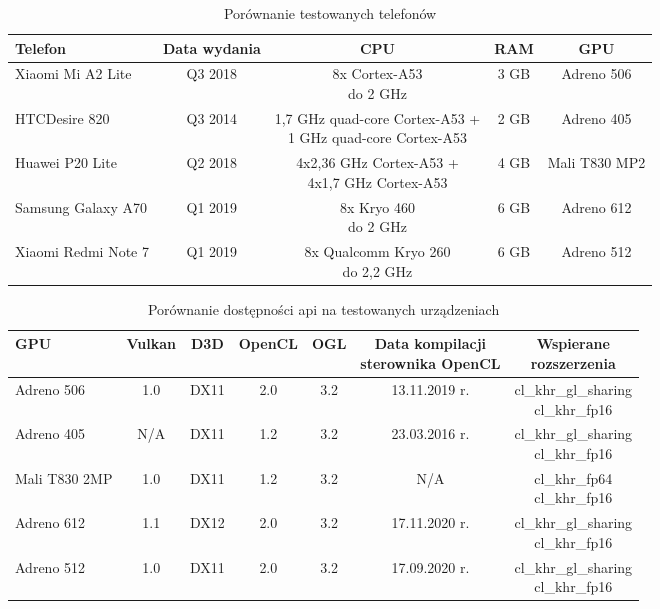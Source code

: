 \begin{table}[H]
    \caption{Porównanie testowanych telefonów}
    \label{tab:skale}
    \begin{tabular}{|l|c|c|c|c|}
\hline
\textbf{Telefon} & \textbf{Data wydania} & \textbf{CPU} & \textbf{RAM} & \textbf{GPU}\\
\hline
Xiaomi Mi A2 Lite & Q3 2018 & \makecell{8x Cortex-A53 \\ do 2 GHz} & 3 GB & Adreno 506\\
\hline
HTCDesire 820 & Q3 2014 & \makecell{1,7 GHz quad-core Cortex-A53 + \\ 1 GHz quad-core Cortex-A53} & 2 GB & Adreno 405 \\
\hline
Huawei P20 Lite & Q2 2018 & \makecell{4x2,36 GHz Cortex-A53 + \\ 4x1,7 GHz Cortex-A53} & 4 GB & Mali T830 MP2 \\
\hline
Samsung Galaxy A70 & Q1 2019 & \makecell{8x Kryo 460 \\ do 2 GHz } & 6 GB & Adreno 612 \\
\hline
Xiaomi Redmi Note 7 & Q1 2019 & \makecell{8x Qualcomm Kryo 260 \\ do 2,2 GHz} & 6 GB & Adreno 512 \\
\hline
\end{tabular}
\end{table}
\begin{table}[H]
    \caption{Porównanie dostępności api na testowanych urządzeniach}
    \label{tab:skale}
    \begin{tabular}{|l|c|c|c|c|c|c|}
\hline
\textbf{GPU} & \textbf{Vulkan} & \textbf{D3D} & \textbf{OpenCL} & \textbf{OGL} & \makecell{\textbf{Data kompilacji} \\ \textbf{sterownika OpenCL}} & \makecell{\textbf{Wspierane} \\ \textbf{rozszerzenia}}\\
\hline
Adreno 506 & 1.0 & DX11 & 2.0 & 3.2 & 13.11.2019 r. & \makecell{cl\_khr\_gl\_sharing \\ cl\_khr\_fp16}\\
\hline
Adreno 405 & N/A & DX11 & 1.2 & 3.2 & 23.03.2016 r. & \makecell{cl\_khr\_gl\_sharing \\ cl\_khr\_fp16}\\
\hline
Mali T830 2MP & 1.0 & DX11 & 1.2 & 3.2 & N/A & \makecell{cl\_khr\_fp64 \\ cl\_khr\_fp16}\\
\hline
Adreno 612 & 1.1 & DX12 & 2.0 & 3.2 & 17.11.2020 r. & \makecell{cl\_khr\_gl\_sharing \\ cl\_khr\_fp16}\\
\hline
Adreno 512 & 1.0 & DX11 & 2.0 & 3.2 & 17.09.2020 r. & \makecell{cl\_khr\_gl\_sharing \\ cl\_khr\_fp16}\\
\hline
\end{tabular}
\end{table}

